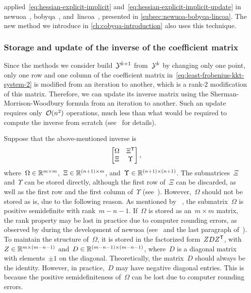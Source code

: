 \citeauthor{Powell_2006} applied~\cref{eq:hessian-explicit-implicit} and~\cref{eq:hessian-explicit-implicit-update} in \gls{newuoa}~\cite{Powell_2006}, \gls{bobyqa}~\cite{Powell_2009}, and~\gls{lincoa}~\cite{Powell_2015}, presented in \cref{subsec:newuoa-bobyqa-lincoa}.
The new method we introduce in \cref{ch:cobyqa-introduction} also uses this technique.

\subsubsection{Storage and update of the inverse of the coefficient matrix}

Since the methods we consider build~$\xpt[k + 1]$ from~$\xpt[k]$ by changing only one point, only one row and one column of the coefficient matrix in~\cref{eq:least-frobenius-kkt-system-2} is modified from an iteration to another, which is a rank-$2$ modification of this matrix.
Therefore, we can update its inverse matrix using the Sherman-Morrison-Woodbury formula from an iteration to another.
Such an update requires only~$\operatorname{\mathcal{O}}(n^2)$ operations, much less than what would be required to compute the inverse from scratch (see~\cite[\S~2]{Powell_2004c} for details).

Suppose that the above-mentioned inverse is
\begin{equation*}
    \begin{bmatrix}
        \Omega  & \Xi^{\mathsf{T}}\\
        \Xi     & \Upsilon
    \end{bmatrix},
\end{equation*}
where~$\Omega \in \mathbb{R}^{m \times m}$,~$\Xi \in \mathbb{R}^{(n + 1) \times m}$, and~$\Upsilon \in \mathbb{R}^{(n + 1) \times (n + 1)}$.
The submatrices~$\Xi$ and~$\Upsilon$ can be stored directly, although the first row of~$\Xi$ can be discarded, as well as the first row and the first column of~$\Upsilon$ (see~\cite[\S~4]{Powell_2006}).
However,~$\Omega$ should not be stored as is, due to the following reason.
As mentioned by \citeauthor{Powell_2004c}~\cite{Powell_2004c}, the submatrix~$\Omega$ is positive semidefinite with rank~$m - n - 1$.
If~$\Omega$ is stored as an~$m \times m$ matrix, the rank property may be lost in practice due to computer rounding errors, as observed by \citeauthor{Powell_2004c} during the development of \gls{newuoa} (see~\cite[\S~1]{Powell_2004c} and the last paragraph of~\cite[\S~8]{Powell_2006}).
To maintain the structure of~$\Omega$, it is stored in the factorized form~$Z D Z^{\mathsf{T}}$, with~$Z \in \mathbb{R}^{m \times (m - n - 1)}$ and~$D \in \mathbb{R}^{(m - n - 1) \times (m - n - 1)}$, where~$D$ is a diagonal matrix with elements~$\pm 1$ on the diagonal.
Theoretically, the matrix~$D$ should always be the identity.
However, in practice,~$D$ may have negative diagonal entries.
This is because the positive semidefiniteness of~$\Omega$ can be lost due to computer rounding errors.

